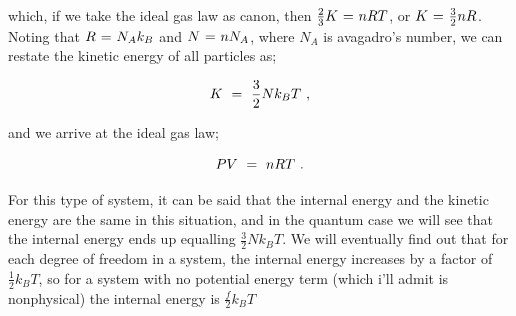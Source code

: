 \documentclass{article}
\begin{document}
which, if we take the ideal gas law as canon, then \begin{math} \frac{2}{3} K \hspace{0.025cm} = \hspace{0.025cm} n R T \end{math}, or \begin{math} K \hspace{0.025cm} = \hspace{0.025cm} \frac{3}{2} n R \end{math}. Noting that \begin{math} R \hspace{0.025cm} = \hspace{0.025cm} N_A k_B  \end{math} and \begin{math} N \hspace{0.025cm} = \hspace{0.025cm} n N_A \end{math}, where \begin{math} N_A \end{math} is avagadro's number, we can restate the kinetic energy of all particles as;

\begin{equation} \label{eb-eq-256-69}
K \hspace{0.125cm} = \hspace{0.125cm} \frac{3}{2} N k_B T \hspace{0.125cm} ,
\end{equation}

and we arrive at the ideal gas law;

\begin{equation} \label{eb-eq-256-70}
P V \hspace{0.125cm} = \hspace{0.125cm} n R T \hspace{0.125cm} .
\end{equation}

For this type of system, it can be said that the internal energy and the kinetic energy are the same in this situation, and in the quantum case we will see that the internal energy ends up equalling \begin{math} \frac{3}{2} N k_B T \end{math}. We will eventually find out that for each degree of freedom in a system, the internal energy increases by a factor of \begin{math} \frac{1}{2} k_B T \end{math}, so for a system with no potential energy term (which i'll admit is nonphysical) the internal energy is \begin{math} \frac{f}{2} k_B T \end{math}
\end{document}

